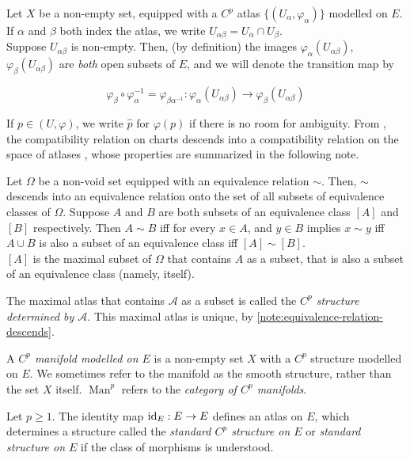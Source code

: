 \documentclass[../main-manifolds.tex]{subfiles}
\begin{document}
Let $X$ be a non-empty set, equipped with a $C^p$ atlas $\{(U_\alpha,\varphi_\alpha)\}$ modelled on $E$. If $\alpha$ and $\beta$ both index the atlas, we write  $U_{\alpha\beta} = U_{\alpha}\cap U_{\beta}$.\\

Suppose $U_{\alpha\beta}$ is non-empty. Then, (by definition) the images $\varphi_{\alpha}(U_{\alpha\beta})$, $\varphi_{\beta}(U_{\alpha\beta})$ are \emph{both} open subsets of $E$, and we will denote the transition map by

\begin{equation}\label{def-transition-map}
    \varphi_{\beta}\circ\varphi_{\alpha}^{-1}=\varphi_{\beta\alpha^{-1}}: \varphi_{\alpha}(U_{\alpha\beta})\to\varphi_{\beta}(U_{\alpha\beta})
\end{equation}

If $p\in (U,\varphi)$, we write $\hat{p}$ for $\varphi(p)$ if there is no room for ambiguity. From , the compatibility relation on charts descends into a compatibility relation on the space of atlases , whose properties are summarized in the following note.

\begin{note}\label{note:equivalence-relation-descends}
    Let $\Omega$ be a non-void set equipped with an equivalence relation $\sim$. Then, $\sim$ descends into an equivalence relation onto the set of all subsets of equivalence classes of $\Omega$. Suppose $A$ and $B$ are both subsets of an equivalence class $[A]$ and $[B]$ respectively. Then $A\sim B$ iff for every $x\in A$, and $y\in B$ implies $x\sim y$ iff $A\cup B$ is also a subset of an equivalence class iff $[A]\sim[B]$.\\

    $[A]$ is the maximal subset of $\Omega$ that contains $A$ as a subset, that is also a subset of an equivalence class (namely, itself).
\end{note}

\begin{definition}\label{def:structure-of-manifold}
    The maximal atlas that contains $\mathcal{A}$ as a subset is called the \emph{$C^p$ structure determined by $\mathcal{A}$}. This maximal atlas is unique, by \cref{note:equivalence-relation-descends}.
\end{definition}
\begin{definition}[Manifold]\label{def:manifold}
    A \emph{$C^p$ manifold modelled on $E$} is a non-empty set $X$ with a $C^p$ structure modelled on $E$. We sometimes refer to the manifold as the smooth structure, rather than the set $X$ itself. $\operatorname{Man}^p$ refers to the \emph{category of $C^p$ manifolds}.
\end{definition}
\begin{wts}[$E$ is a manifold]
    Let $p\geq 1$. The identity map $\operatorname{id}_{E}: E\to E$ defines an atlas on $E$, which determines a structure called the \emph{standard $C^p$ structure on $E$} or \emph{standard structure on $E$} if the class of morphisms is understood.\\
\end{wts}
\end{document}
